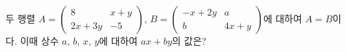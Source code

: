 두 행렬 $A=\begin{pmatrix} 8 & x+y \\ 2x+3y & -5 \end{pmatrix}$, $B=\begin{pmatrix} -x+2y & a \\ b & 4x+y \end{pmatrix}$에 대하여 $A=B$이다. 이때 상수 $a$, $b$, $x$, $y$에 대하여 $ax+by$의 값은?
